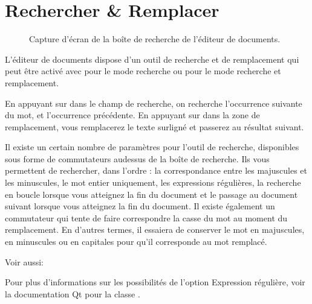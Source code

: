 \documentclass[a4paper,11pt,french]{sphinxmanual}
\begin{document}
\section{Rechercher \& Remplacer}
\label{\detokenize{usage_writing:search-replace}}\label{\detokenize{usage_writing:a-ui-edit-search}}
\begin{figure}[htbp]
\centering
\capstart

\noindent{}
\caption{Capture d’écran de la boîte de recherche de l’éditeur de documents.}\label{\detokenize{usage_writing:id3}}\end{figure}

\sphinxAtStartPar
L’éditeur de documents dispose d’un outil de recherche et de remplacement qui peut être activé avec  pour le mode recherche ou  pour le mode recherche et remplacement.

\sphinxAtStartPar
En appuyant sur  dans le champ de recherche, on recherche l’occurrence suivante du mot, et  l’occurrence précédente. En appuyant sur  dans la zone de remplacement, vous remplacerez le texte surligné et passerez au résultat suivant.

\sphinxAtStartPar
Il existe un certain nombre de paramètres pour l’outil de recherche, disponibles sous forme de commutateurs au\sphinxhyphen{}dessus de la boîte de recherche. Ils vous permettent de rechercher, dans l’ordre : la correspondance entre les majuscules et les minuscules, le mot entier uniquement, les expressions régulières, la recherche en boucle lorsque vous atteignez la fin du document et le passage au document suivant lorsque vous atteignez la fin du document. Il existe également un commutateur qui tente de faire correspondre la casse du mot au moment du remplacement. En d’autres termes, il essaiera de conserver le mot en majuscules, en minuscules ou en capitales pour qu’il corresponde au mot remplacé.


\begin{sphinxseealso}{Voir aussi:}

\sphinxAtStartPar
Pour plus d’informations sur les possibilités de l’option Expression régulière, voir la documentation Qt pour la classe .


\end{sphinxseealso}
\end{document}

